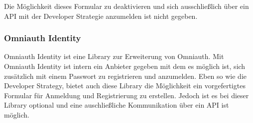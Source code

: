 \documentclass[11pt]{article}
\begin{document}
\begin{flushleft}
			Die Möglichkeit dieses Formular zu deaktivieren und sich ausschließlich über ein API mit der Developer Strategie anzumelden ist nicht gegeben.\par\bigskip
			
			
			\subsubsection{Omniauth Identity}
			\label{sec: omniauth_identity}
			Omniauth Identity ist eine Library zur Erweiterung von Omniauth. Mit Omniauth Identity ist intern ein Anbieter gegeben mit dem es möglich ist, sich zusätzlich mit einem Passwort zu registrieren und anzumelden. Eben so wie die Developer Strategy, bietet auch diese Library die Möglichkeit ein vorgefertigtes Formular für Anmeldung und Registrierung zu erstellen. Jedoch ist es bei dieser Library optional und eine auschließliche Kommunikation über ein API ist möglich.
			
			
			
			
			
			
			
			
		\end{flushleft}
	
	
\end{document}

